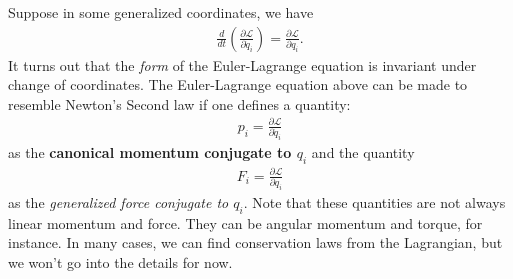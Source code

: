 \documentclass{book}
\theoremstyle{definition}
\newcommand{\p}{\partial}
\newcommand{\lag}{\mathcal{L}}
\newcommand{\f}[2]{\frac{#1}{#2}}
\newcommand{\lp}{\left(}
\newcommand{\rp}{\right)}
\begin{document}
Suppose in some generalized coordinates, we have
\begin{align}
\f{d}{dt}\lp \f{\p \lag}{\p \dot{q}_i} \rp = \f{\p \lag}{\p q_i}.
\end{align}
It turns out that the \textit{form} of the Euler-Lagrange equation is invariant under change of coordinates. The Euler-Lagrange equation above can be made to resemble Newton's Second law if one defines a quantity:
\begin{align}
p_i = \f{\p \lag}{\p \dot{q}_i}
\end{align}
as the \textbf{canonical momentum conjugate to $q_i$} and the quantity
\begin{align}
F_i = \f{\p \lag}{\p q_i}
\end{align}
as the \textit{generalized force conjugate to $q_i$}. Note that these quantities are not always linear momentum and force. They can be angular momentum and torque, for instance. In many cases, we can find conservation laws from the Lagrangian, but we won't go into the details for now.
\end{document}
